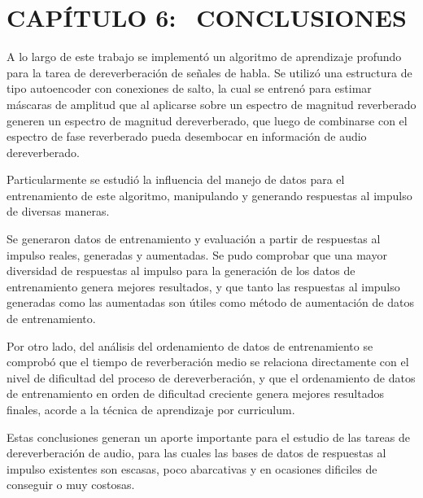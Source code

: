 \section[Conclusiones]{CAPÍTULO 6:$\ \ \ \ $CONCLUSIONES} 

A lo largo de este trabajo se implementó un algoritmo de aprendizaje profundo para la tarea de dereverberación de señales de habla. Se utilizó una estructura de tipo autoencoder con conexiones de salto, la cual se entrenó para estimar máscaras de amplitud que al aplicarse sobre un espectro de magnitud reverberado generen un espectro de magnitud dereverberado, que luego de combinarse con el espectro de fase reverberado pueda desembocar en información de audio dereverberado.
 
Particularmente se estudió la influencia del manejo de datos para el entrenamiento de este algoritmo, manipulando y generando respuestas al impulso de diversas maneras. 

Se generaron datos de entrenamiento y evaluación a partir de respuestas al impulso reales, generadas y aumentadas. Se pudo comprobar que una mayor diversidad de respuestas al impulso para la generación de los datos de entrenamiento genera mejores resultados, y que tanto las respuestas al impulso generadas como las aumentadas son útiles como método de aumentación de datos de entrenamiento.

Por otro lado, del análisis del ordenamiento de datos de entrenamiento se comprobó que el tiempo de reverberación medio se relaciona directamente con el nivel de dificultad del proceso de dereverberación, y que el ordenamiento de datos de entrenamiento en orden de dificultad creciente genera mejores resultados finales, acorde a la técnica de aprendizaje por curriculum.
 
Estas conclusiones generan un aporte importante para el estudio de las tareas de dereverberación de audio, para las cuales las bases de datos de respuestas al impulso existentes son escasas, poco abarcativas y en ocasiones dificiles de conseguir o muy costosas.
